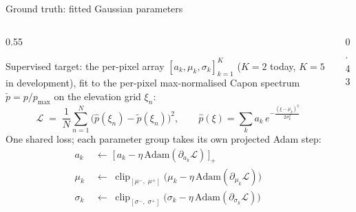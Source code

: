 \begin{frame}{Ground truth: fitted Gaussian parameters}
  \small
  \begin{columns}[T]
    \begin{column}{0.55\textwidth}
      \begin{minipage}[t][0.68\textheight]{\linewidth}
      \vfill
      Supervised target: the per-pixel array $[a_k,\mu_k,\sigma_k]_{k=1}^{K}$
      ($K{=}2$ today, $K{=}5$ in development), fit to the per-pixel max-normalised
      Capon spectrum $\tilde p = p/p_{\max}$ on the elevation grid $\xi_n$:
      \[
        \mathcal{L} \;=\; \frac{1}{N}\sum_{n=1}^{N}\big(\hat p(\xi_n)-\tilde p(\xi_n)\big)^{2},
        \qquad
        \hat p(\xi) = \sum_{k} a_k\, e^{-\frac{(\xi-\mu_k)^2}{2\sigma_k^2}}
      \]
      \vfill
      One shared loss; each parameter group takes its own projected Adam step:
      \[
        \begin{aligned}
          a_k      &\;\leftarrow\; \big[\, a_k - \eta\,\mathrm{Adam}(\partial_{a_k}\mathcal{L}) \,\big]_{+} \\[-1pt]
          \mu_k    &\;\leftarrow\; \operatorname{clip}_{[\mu^-\!,\;\mu^+]}\big( \mu_k - \eta\,\mathrm{Adam}(\partial_{\mu_k}\mathcal{L}) \big) \\[-1pt]
          \sigma_k &\;\leftarrow\; \operatorname{clip}_{[\sigma^-\!,\;\sigma^+]}\big( \sigma_k - \eta\,\mathrm{Adam}(\partial_{\sigma_k}\mathcal{L}) \big)
        \end{aligned}
      \]
      \vfill
      \end{minipage}
    \end{column}
    \begin{column}{0.43\textwidth}
      \centering
\end{column}
\end{columns}
\end{frame}
